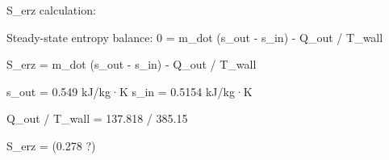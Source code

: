 S_erz calculation:  

Steady-state entropy balance:  
0 = m_dot (s_out - s_in) - Q_out / T_wall  

S_erz = m_dot (s_out - s_in) - Q_out / T_wall  

s_out = 0.549 kJ/kg·K  
s_in = 0.5154 kJ/kg·K  

Q_out / T_wall = 137.818 / 385.15  

S_erz = (0.278 ?)